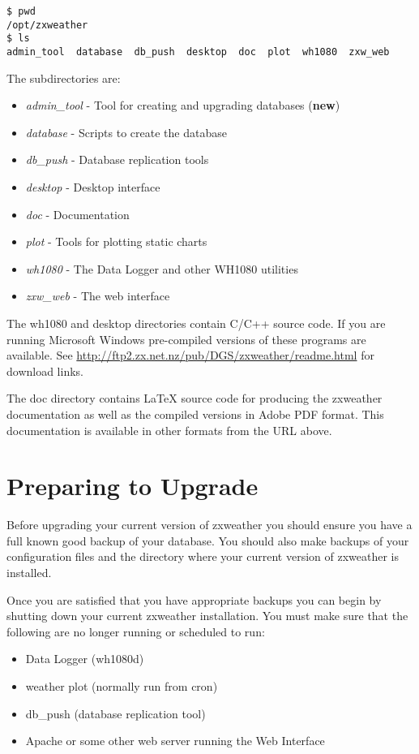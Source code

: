 \documentclass[a4paper,10pt,draft]{book}
\begin{document}
\begin{verbatim}
$ pwd
/opt/zxweather
$ ls
admin_tool  database  db_push  desktop  doc  plot  wh1080  zxw_web
\end{verbatim}

The subdirectories are:

\begin{itemize}
\item \emph{admin\_tool} - Tool for creating and upgrading databases (\textbf{new})
\item \emph{database} - Scripts to create the database
\item \emph{db\_push} - Database replication tools
\item \emph{desktop}  - Desktop interface
\item \emph{doc} - Documentation
\item \emph{plot} - Tools for plotting static charts
\item \emph{wh1080} - The Data Logger and other WH1080 utilities
\item \emph{zxw\_web} - The web interface
\end{itemize}

The wh1080 and desktop directories contain C/C++ source code. If you are running Microsoft Windows pre-compiled versions of these programs are available. See \url{http://ftp2.zx.net.nz/pub/DGS/zxweather/readme.html} for download links.

The doc directory contains \LaTeX{} source code for producing the zxweather documentation as well as the compiled versions in Adobe PDF format. This documentation is available in other formats from the URL above.

\chapter{Preparing to Upgrade}
Before upgrading your current version of zxweather you should ensure you have a full known good backup of your database. You should also make backups of your configuration files and the directory where your current version of zxweather is installed.

Once you are satisfied that you have appropriate backups you can begin by shutting down your current zxweather installation. You must make sure that the following are no longer running or scheduled to run:
\begin{itemize}
\item Data Logger (wh1080d)
\item weather plot (normally run from cron)
\item db\_push (database replication tool)
\item Apache or some other web server running the Web Interface
\end{itemize}
\end{document}

